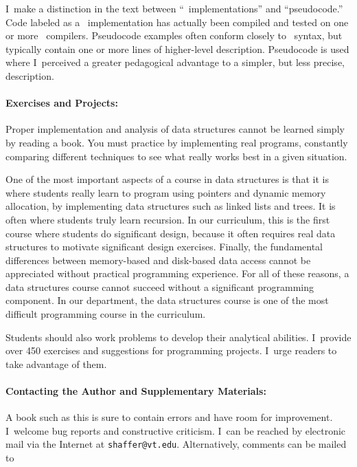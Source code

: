 I~make a distinction in the text between ``\Lang\
implementations'' and ``pseudocode.''
Code labeled as a \Lang\ implementation has actually been
compiled and tested on one or more \Lang\ compilers.
Pseudocode examples often conform closely to \Lang\ syntax, but
typically contain one or more lines of higher-level description.
Pseudocode is used where I~perceived a greater pedagogical
advantage to a simpler, but less precise, description.

\paragraph{Exercises and Projects:}
Proper implementation and analysis of data structures cannot be learned
simply by reading a book.
You must practice by implementing real programs,
constantly comparing different techniques to see what really works
best in a given situation.

One of the most important aspects of a course in data structures is
that it is where students really learn to program using pointers and
dynamic memory allocation, by implementing data structures such as
linked lists and trees.
It is often where students truly learn recursion.
In our curriculum, this is the first course where students do
significant design, because it often requires real data structures to
motivate significant design exercises.
Finally, the fundamental differences between memory-based and
disk-based data access cannot be appreciated without practical
programming experience.
For all of these reasons, a data structures course cannot succeed
without a significant programming component.
In our department, the data structures course is one of the most
difficult programming course in the curriculum.

Students should also work problems to develop their
analytical abilities.
I~provide over 450 exercises and suggestions for programming
projects.
I~urge readers to take advantage of them.

\paragraph{Contacting the Author and Supplementary Materials:}
A book such as this is sure to contain errors and have room for
improvement.
I~welcome bug reports and constructive criticism.
I~can be reached by electronic mail via the Internet at
{\tt shaffer@vt.edu}.
Alternatively, comments can be mailed to

